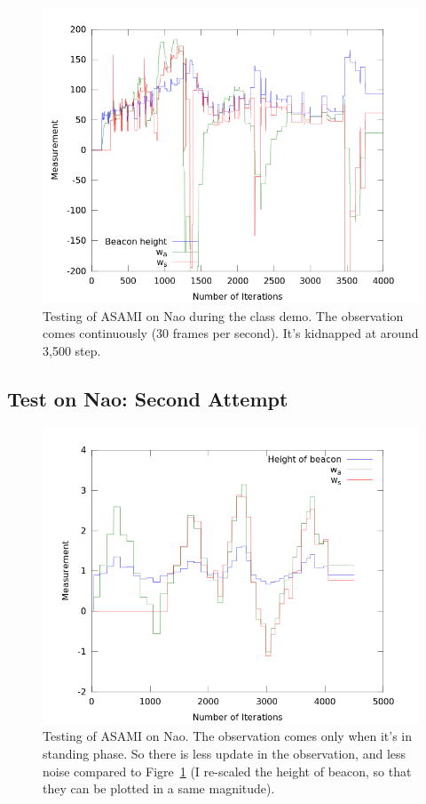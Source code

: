 \documentclass[10pt]{IEEEtran}
\begin{document}
\begin{figure}
\centering
\includegraphics[width=\columnwidth]{demoResult.png}
\caption{Testing of ASAMI on Nao during the class demo. The
observation comes continuously (30 frames per second). It's kidnapped
at around 3,500 step.}
\label{fig:demo}
\end{figure}

\subsection{Test on Nao: Second Attempt}

\begin{figure}
\centering
\includegraphics[width=\columnwidth]{out_obs.png}
\caption{Testing of ASAMI on Nao. The observation comes only when it's
in standing phase. So there is less update in the observation, and
less noise compared to Figre~\ref{fig:demo} (I re-scaled the height of
beacon, so that they can be plotted in a same magnitude).}
\label{fig:obs}
\end{figure}
\end{document}
